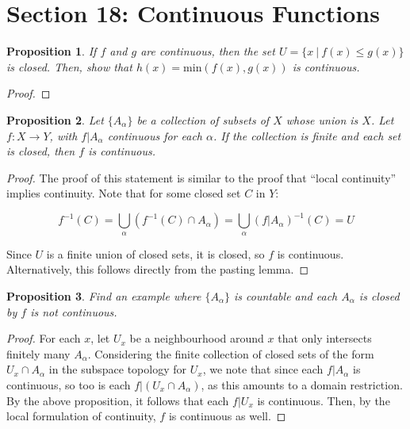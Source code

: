 \documentclass[10pt, oneside]{amsart}
\newtheorem{prop}{Proposition}
\begin{document}
    \section{Section 18: Continuous Functions}

    \begin{prop}
      If $f$ and $g$ are continuous, then the set $U = \{x \ | \ f(x) \leq g(x) \}$ is closed. Then, show that $h(x) = \text{min} \left(f(x), g(x)\right)$ is continuous.
    \end{prop}

    \begin{proof}
      
    \end{proof}

    \begin{prop}
      Let $\{A_{\alpha} \}$ be a collection of subsets of $X$ whose union is $X$. Let $f : X \rightarrow Y$, with $f | A_{\alpha}$ continuous for each $\alpha$. If the collection is finite and each
      set is closed, then $f$ is continuous.
    \end{prop}

    \begin{proof}
      The proof of this statement is similar to the proof that ``local continuity'' implies continuity. Note that for some closed set $C$ in $Y$:

      $$f^{-1}(C) =  \displaystyle\bigcup_{\alpha} \left( f^{-1}(C) \cap A_\alpha \right) = \displaystyle\bigcup_{\alpha} (f|{A_\alpha})^{-1}(C) = U$$

      Since $U$ is a finite union of closed sets, it is closed, so $f$ is continuous. Alternatively, this follows directly from the pasting lemma.
    \end{proof}

    \begin{prop}
      Find an example where $\{A_\alpha\}$ is countable and each $A_\alpha$ is closed by $f$ is not continuous.
    \end{prop}

    \begin{proof}
      For each $x$, let $U_x$ be a neighbourhood around $x$ that only intersects finitely many $A_\alpha$. Considering the finite collection of closed sets of the form $U_x \cap A_\alpha$ in the subspace
      topology for $U_x$, we note that since each $f | A_\alpha$ is continuous, so too is each $f | (U_x \cap A_\alpha)$, as this amounts to a domain restriction. By the above proposition, it follows that each
      $f | U_x$ is continuous. Then, by the local formulation of continuity, $f$ is continuous as well.
    \end{proof}
\end{document}
